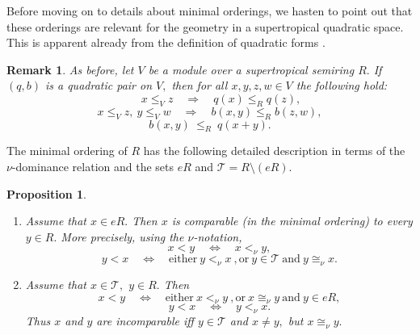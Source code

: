\documentclass [12pt,a4paper,reqno]{amsart}
\newtheorem{prop}[thm]{Proposition}
\newtheorem{remark}[thm]{Remark}
\begin{document}
Before moving on to details about minimal orderings, we hasten to point out that these orderings are relevant for the geometry in a supertropical quadratic space. This is apparent already from the definition of quadratic forms {\cite[Definition~{{0.1}}]{QF1}}.

\begin{remark}\label{rem:I.6.3} As before, let $V$ be a module over a supertropical semiring $R.$ If $(q,b)$ is a quadratic pair on $V,$ then for all $x,y,z,w\in V$ the following hold:
\begin{equation}\label{eq:I.6.5}
\qquad x\le _V z {\quad {\Rightarrow} \quad } q(x)\le_R q(z),\end{equation}
\begin{equation}\label{eq:I.6.6}
x\le _V z,\ y\le_V w{\quad {\Rightarrow} \quad } b(x,y)\le_R b(z,w),\end{equation}
\begin{equation}\label{eq:I.6.7}
b(x,y) {\ {{\le_R}} \ }  q(x+y).\end{equation}
\end{remark}

The minimal ordering of $R$ has the following detailed description in terms of the $\nu$-dominance relation and the sets $eR$ and ${\mathcal T}=R{\setminus} (eR).$

\begin{prop}\label{prop:I.6.3}
\quad

\begin{enumerate}
\item[a)] Assume that $x\in eR.$ Then $x$ is comparable (in the minimal ordering) to every $y\in R.$ More
precisely, using the $\nu$-notation,
\begin{equation}\label{eq:I.6.8}
x<y {\quad {\Leftrightarrow} \quad } x<_\nu y,\end{equation}
\begin{equation}\label{eq:I.6.9}
y<x {\quad {\Leftrightarrow} \quad } \text{either}\ y<_\nu x\ ,  \text{or}\ y\in{\mathcal T}\ \text{and}\ y\cong_\nu x.\end{equation} {\vskip 1.5mm \noindent}
\item[b)] Assume that $x\in{\mathcal T},$ $y\in R.$ Then
\begin{equation}\label{eq:I.6.10}
x<y{\quad {\Leftrightarrow} \quad } \text{either}\ x <_\nu y\ , \text{or}\ x\cong_\nu y\ \text{and}\ y\in eR,\end{equation}
\begin{equation}\label{eq:I.6.11}
y<x {\quad {\Leftrightarrow} \quad }   y<_\nu x.\end{equation}
Thus $x$ and $y$ are incomparable iff $y\in {\mathcal T}$ and $x\ne y,$ but $x\cong_\nu y.$
\end{enumerate}

\end{prop}
\end{document}
